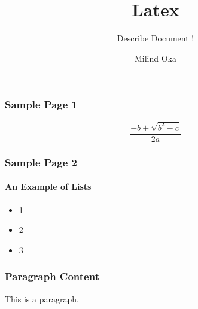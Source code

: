 \documentclass{beamer}
\title{Latex}
\author{Milind Oka}
\subtitle{Describe Document !}
\begin{document}
	\frame 
	{
		\titlepage
	}
	
	
	\frame 
	{
		\frametitle{Sample Page 1}
		\[\frac{-b \pm \sqrt{b^2 - c}}{2a}\]
	}
	
	
	\frame
	{
		
		\frametitle{Sample Page 2}
		\framesubtitle{An Example of Lists}
		\begin{itemize}
			\item 1
			\item 2
			\item 3
		\end{itemize}
		
	}
	
	\begin{frame}
	    \frametitle{Paragraph Content}
	    This is a paragraph.
	 \end{frame}
	 
	 
\end{document}
